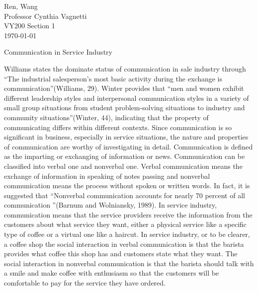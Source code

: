 \documentclass[12pt]{article}
\begin{document}
\begin{flushleft}

Ren, Wang\\
Professor Cynthia Vagnetti \\
VY200 Section 1\\
\today\\


\begin{center}
  Communication in Service Industry
\end{center}


\setlength{\parindent}{0.5in}


Williams states the dominate status of communication in sale industry through
``The industrial salesperson's most basic activity during the exchange is
communication''(Williams, 29). Winter provides that ``men and women exhibit
different leadership styles and interpersonal communication styles in a variety
of small group situations from student problem-solving situations to industry
and community situations''(Winter, 44), indicating that the property of communicating
differs within different contexts.
Since communication is so significant in business, especially in service
situations, the nature and properties of communication are worthy of investigating in detail.
Communication is defined as the imparting or exchanging of information or news.
Communication can be classified into verbal one and nonverbal one. Verbal
communication means the exchange of information in speaking of notes passing and
nonverbal communication means the process without spoken or written words. In
fact, it is suggested that ``Nonverbal communication accounts for nearly 70 percent
of all communication ''(Barnum and Wolniansky, 1989).
In service industry, communication means that the service providers receive the
information from the customers about what service they want, either a physical
service like a specific type of coffee or a virtual one like a haircut.
In service industry, or to be clearer, a coffee shop the social interaction in
verbal communication is that the barista provides what coffee this shop has and
customers state what they want. The social interaction in nonverbal
communication is that the barista should talk with a smile and make
coffee with enthusiasm so that the customers will be comfortable to pay for the
service they have ordered.

\end{flushleft}
\end{document}
